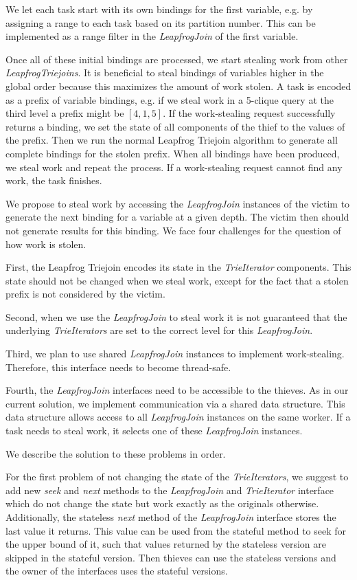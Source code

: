 We let each task start with its own bindings for the first variable, e.g. by assigning
a range to each task based on its partition number.
This can be implemented as a range filter in the \textit{LeapfrogJoin} of the first variable.

Once all of these initial bindings are processed, we start stealing work from other
\textit{LeapfrogTriejoins}.
It is beneficial to steal bindings of variables higher in the global order because this
maximizes the amount of work stolen.
A task is encoded as a prefix of variable bindings, e.g. if we steal work in a 5-clique query at
the third level a prefix might be $[4, 1, 5]$.
If the work-stealing request successfully returns a binding, we set the state of all components
of the thief to the values of the prefix.
Then we run the normal Leapfrog Triejoin algorithm to generate all complete bindings for the stolen
prefix.
When all bindings have been produced, we steal work and repeat the process.
If a work-stealing request cannot find any work, the task finishes.

We propose to steal work by accessing the \textit{LeapfrogJoin} instances of the victim to generate
the next binding for a variable at a given depth.
The victim then should not generate results for this binding.
We face four challenges for the question of how work is stolen.

First, the Leapfrog Triejoin encodes its state in the \textit{TrieIterator} components.
This state should not be changed when we steal work, except for the fact that a stolen
prefix is not considered by the victim.

Second, when we use the \textit{LeapfrogJoin} to steal work it is not guaranteed that the underlying
\textit{TrieIterators} are set to the correct level for this \textit{LeapfrogJoin}.

Third, we plan to use shared \textit{LeapfrogJoin} instances to implement work-stealing.
Therefore, this interface needs to become thread-safe.

Fourth, the \textit{LeapfrogJoin} interfaces need to be accessible to the thieves.
As in our current solution, we implement communication via a shared data structure.
This data structure allows access to all \textit{LeapfrogJoin} instances on the same worker.
If a task needs to steal work, it selects one of these \textit{LeapfrogJoin} instances.

We describe the solution to these problems in order.

For the first problem of not changing the state of the \textit{TrieIterators}, we
suggest to add new \textit{seek} and \textit{next} methods to the \textit{LeapfrogJoin} and
\textit{TrieIterator} interface which do not change the state but work exactly as the originals
otherwise.
Additionally, the stateless \textit{next} method of the \textit{LeapfrogJoin} interface stores
the last value it returns.
This value can be used from the stateful method to seek for the upper bound of it, such that
values returned by the stateless version are skipped in the stateful version.
Then thieves can use the stateless versions and the owner of the interfaces uses the stateful
versions.


